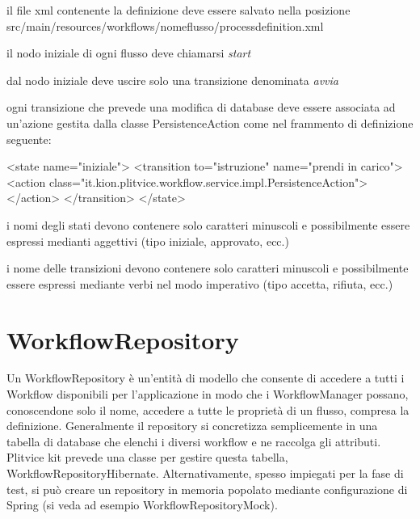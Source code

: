 \begin{itemize*}
\item il file xml contenente la definizione deve essere salvato nella posizione  src/main/resources/workflows/nomeflusso/processdefinition.xml

\item il nodo iniziale di ogni flusso deve chiamarsi \textit{start} 

\item dal nodo iniziale deve uscire solo una transizione denominata \textit{avvia}

\item ogni transizione che prevede una modifica di database deve essere associata ad un'azione gestita dalla classe PersistenceAction come nel frammento di definizione seguente:
\begin{xml}
<state name="iniziale">
    <transition to="istruzione" name="prendi in carico">
      <action class="it.kion.plitvice.workflow.service.impl.PersistenceAction"></action>
    </transition>
  </state>
\end{xml}

\item i nomi degli stati devono contenere solo caratteri minuscoli e possibilmente essere espressi medianti aggettivi (tipo iniziale, approvato, ecc.)

\item i nome delle transizioni devono contenere solo caratteri minuscoli e possibilmente essere espressi mediante verbi nel modo imperativo (tipo accetta, rifiuta, ecc.)

\end{itemize*}


\section{WorkflowRepository}
Un WorkflowRepository è un'entità di modello che consente di accedere a tutti i Workflow disponibili per l'applicazione in modo che i WorkflowManager possano, conoscendone solo il nome, accedere a tutte le proprietà di un flusso, compresa la definizione. 
Generalmente il repository si concretizza semplicemente in una tabella di database che elenchi i diversi workflow e ne raccolga gli attributi. Plitvice kit prevede una classe per gestire questa tabella,  WorkflowRepositoryHibernate.
Alternativamente, spesso impiegati per la fase di test, si può creare un repository in memoria popolato mediante configurazione di Spring (si veda ad esempio WorkflowRepositoryMock).

